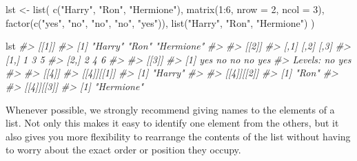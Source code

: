 \documentclass[
]{book}
\newenvironment{Shaded}{\begin{snugshade}}{\end{snugshade}}
\newcommand{\AttributeTok}[1]{\textcolor[rgb]{0.77,0.63,0.00}{#1}}
\newcommand{\CommentTok}[1]{\textcolor[rgb]{0.56,0.35,0.01}{\textit{#1}}}
\newcommand{\DecValTok}[1]{\textcolor[rgb]{0.00,0.00,0.81}{#1}}
\newcommand{\FunctionTok}[1]{\textcolor[rgb]{0.00,0.00,0.00}{#1}}
\newcommand{\NormalTok}[1]{#1}
\newcommand{\OtherTok}[1]{\textcolor[rgb]{0.56,0.35,0.01}{#1}}
\newcommand{\SpecialCharTok}[1]{\textcolor[rgb]{0.00,0.00,0.00}{#1}}
\newcommand{\StringTok}[1]{\textcolor[rgb]{0.31,0.60,0.02}{#1}}
\begin{document}
\begin{Shaded}
\begin{Highlighting}[]
\NormalTok{lst }\OtherTok{\textless{}{-}} \FunctionTok{list}\NormalTok{(}
  \FunctionTok{c}\NormalTok{(}\StringTok{"Harry"}\NormalTok{, }\StringTok{"Ron"}\NormalTok{, }\StringTok{"Hermione"}\NormalTok{),}
  \FunctionTok{matrix}\NormalTok{(}\DecValTok{1}\SpecialCharTok{:}\DecValTok{6}\NormalTok{, }\AttributeTok{nrow =} \DecValTok{2}\NormalTok{, }\AttributeTok{ncol =} \DecValTok{3}\NormalTok{),}
  \FunctionTok{factor}\NormalTok{(}\FunctionTok{c}\NormalTok{(}\StringTok{"yes"}\NormalTok{, }\StringTok{"no"}\NormalTok{, }\StringTok{"no"}\NormalTok{, }\StringTok{"no"}\NormalTok{, }\StringTok{"yes"}\NormalTok{)),}
  \FunctionTok{list}\NormalTok{(}\StringTok{"Harry"}\NormalTok{, }\StringTok{"Ron"}\NormalTok{, }\StringTok{"Hermione"}\NormalTok{)}
\NormalTok{)}

\NormalTok{lst}
\CommentTok{\#\textgreater{} [[1]]}
\CommentTok{\#\textgreater{} [1] "Harry"    "Ron"      "Hermione"}
\CommentTok{\#\textgreater{} }
\CommentTok{\#\textgreater{} [[2]]}
\CommentTok{\#\textgreater{}      [,1] [,2] [,3]}
\CommentTok{\#\textgreater{} [1,]    1    3    5}
\CommentTok{\#\textgreater{} [2,]    2    4    6}
\CommentTok{\#\textgreater{} }
\CommentTok{\#\textgreater{} [[3]]}
\CommentTok{\#\textgreater{} [1] yes no  no  no  yes}
\CommentTok{\#\textgreater{} Levels: no yes}
\CommentTok{\#\textgreater{} }
\CommentTok{\#\textgreater{} [[4]]}
\CommentTok{\#\textgreater{} [[4]][[1]]}
\CommentTok{\#\textgreater{} [1] "Harry"}
\CommentTok{\#\textgreater{} }
\CommentTok{\#\textgreater{} [[4]][[2]]}
\CommentTok{\#\textgreater{} [1] "Ron"}
\CommentTok{\#\textgreater{} }
\CommentTok{\#\textgreater{} [[4]][[3]]}
\CommentTok{\#\textgreater{} [1] "Hermione"}
\end{Highlighting}
\end{Shaded}

Whenever possible, we strongly recommend giving names to the elements of a list.
Not only this makes it easy to identify one element from the others, but it also
gives you more flexibility to rearrange the contents of the list without having
to worry about the exact order or position they occupy.
\end{document}
